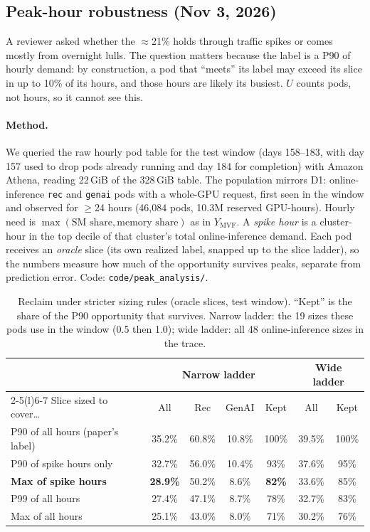 \subsection{Peak-hour robustness (Nov 3, 2026)}
\label{sec:peak}

A reviewer asked whether the $\approx$21\% holds through traffic spikes or comes mostly from overnight lulls. The question matters because the label is a P90 of hourly demand: by construction, a pod that ``meets'' its label may exceed its slice in up to 10\% of its hours, and those hours are likely its busiest. $U$ counts pods, not hours, so it cannot see this.

\paragraph{Method.} We queried the raw hourly pod table for the test window (days 158--183, with day 157 used to drop pods already running and day 184 for completion) with Amazon Athena, reading 22\,GiB of the 328\,GiB table. The population mirrors D1: online-inference \texttt{rec} and \texttt{genai} pods with a whole-GPU request, first seen in the window and observed for $\geq$24 hours (46{,}084 pods, 10.3M reserved GPU-hours). Hourly need is $\max(\text{SM share}, \text{memory share})$ as in $Y_{\text{MVF}}$. A \emph{spike hour} is a cluster-hour in the top decile of that cluster's total online-inference demand. Each pod receives an \emph{oracle} slice (its own realized label, snapped up to the slice ladder), so the numbers measure how much of the opportunity survives peaks, separate from prediction error. Code: \texttt{code/peak\_analysis/}.

\begin{table}[h]
\centering\small
\caption{Reclaim under stricter sizing rules (oracle slices, test window). ``Kept'' is the share of the P90 opportunity that survives. Narrow ladder: the 19 sizes these pods use in the window (0.5 then 1.0); wide ladder: all 48 online-inference sizes in the trace.}
\label{tab:peak}
\begin{tabular}{@{}lcccc@{\hspace{1.2em}}cc@{}}
\toprule
& \multicolumn{4}{c}{Narrow ladder} & \multicolumn{2}{c}{Wide ladder} \\
\cmidrule(lr){2-5}\cmidrule(l){6-7}
Slice sized to cover\ldots & All & Rec & GenAI & Kept & All & Kept \\
\midrule
P90 of all hours (paper's label) & 35.2\% & 60.8\% & 10.8\% & 100\% & 39.5\% & 100\% \\
P90 of spike hours only          & 32.7\% & 56.0\% & 10.4\% & 93\%  & 37.6\% & 95\% \\
\textbf{Max of spike hours}      & \textbf{28.9\%} & 50.2\% & 8.6\% & \textbf{82\%} & 33.6\% & 85\% \\
P99 of all hours                 & 27.4\% & 47.1\% & 8.7\% & 78\%  & 32.7\% & 83\% \\
Max of all hours                 & 25.1\% & 43.0\% & 8.0\% & 71\%  & 30.2\% & 76\% \\
\bottomrule
\end{tabular}
\end{table}


